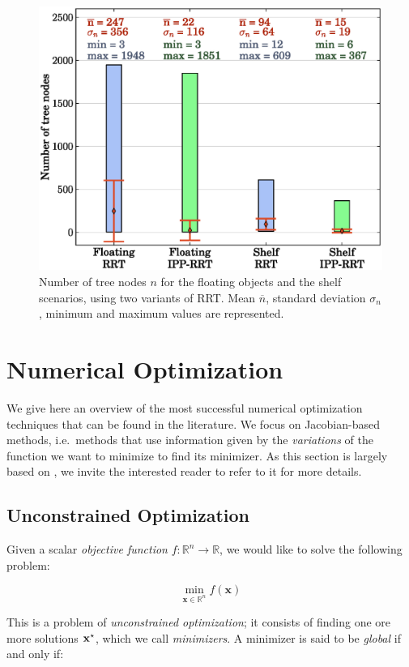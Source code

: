 \begin{figure}
\centering
\includegraphics[width=0.7\linewidth]
                {src/appendix/plots/rrt-n.eps}
\caption[Number of tree nodes for scenarios.]{Number of tree nodes $n$
  for the floating objects and the shelf scenarios, using two variants
  of RRT. Mean $\overline{n}$, standard deviation $\sigma_{n}$,
  minimum and maximum values are represented.}
\label{fig:rrt-n}
\end{figure}

\chapter{Numerical Optimization}
\label{chap:app-numerical-optimization}

We give here an overview of the most successful numerical optimization
techniques that can be found in the literature. We focus on
Jacobian-based methods, i.e.\ methods that use information given by the
\emph{variations} of the function we want to minimize to find its
minimizer. As this section is largely based on
\cite{nocedal1999numerical}, we invite the interested reader to refer
to it for more details.

\section{Unconstrained Optimization}

Given a scalar \emph{objective function} $f:\mathbb R^n \rightarrow
\mathbb R$, we would like to solve the following problem:

\begin{equation}
\min_{\mathbf{x}\in\mathbb R^n}f(\mathbf{x})
\end{equation}

This is a problem of \emph{unconstrained optimization}; it consists of
finding one ore more solutions $\mathbf{x}^{\star}$, which we call
\emph{minimizers}. A minimizer is said to be \emph{global} if and only
if:

